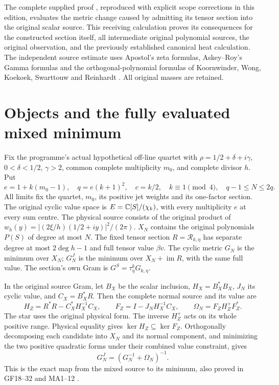 \documentclass[11pt]{article}
\begin{document}
The complete supplied proof \cite{mrjm:Input}, reproduced with explicit
scope corrections in this edition, evaluates the metric change caused by
admitting its tensor section into the original scalar source.
This receiving calculation proves its consequences for the constructed
section itself, all intermediate original polynomial sources, the original
observation, and the previously established canonical heat calculation.
The independent source estimate uses Apostol's zeta formulas,
Askey--Roy's Gamma formulas and the orthogonal-polynomial formulas of
Koornwinder, Wong, Koekoek, Swarttouw and Reinhardt
\cite{mrjm:Apostol,mrjm:Gamma,mrjm:MP}. All original masses are retained.

\section{Objects and the fully evaluated mixed minimum}
Fix the programme's actual hypothetical off-line quartet with
$\rho=1/2+\delta+i\gamma$, $0<\delta<1/2$, $\gamma>2$, common complete
multiplicity $m_0$, and complete divisor $h$. Put
\[
 e=1+k(m_0-1),\quad q=e(k+1)^2,\quad c=k/2,\quad
 k\equiv1\pmod4,\quad q-1\le N\le2q.
 \tag{JM1}
\]
All limits fix the quartet, $m_0$, its positive jet weights and its
one-factor section. The original cyclic value space is
$E=\mathbb C[S]/(\chi_k)$, with every multiplicity $e$ at every sum centre.
The physical source consists of the original product of
$w_h(y)=|(2\xi/h)(1/2+iy)|^2/(2\pi)$.
$X_N$ contains the original polynomials $P(S)$ of degree at most $N$.
The fixed tensor section $R=\mathcal R_{k,\eta}$ has separate degree
at most $2\deg h-1$ and full tensor value $\beta v$.
The cyclic metric $G_N$ is the minimum over $X_N$; $G_N^J$ is the
minimum over $X_N+\operatorname{im}R$, with the same full value.
The section's own Gram is $G^S=\tau_\eta^kG_{k,\eta}$.

In the original source Gram, let $B_X$ be the scalar inclusion,
$H_X=B_X^*B_X$, $J_N$ its cyclic value, and $C_X=B_X^*R$.
Then the complete normal source and its value are
\[
 H_Z=R^*R-C_X^*H_X^{-1}C_X,\qquad
 F_Z=I-J_NH_X^{-1}C_X,\qquad
 \Omega_N=F_ZH_Z^+F_Z^*.
 \tag{JM2}
\]
The star uses the original physical form. The inverse $H_Z^+$ acts on
its whole positive range. Physical equality gives
$\ker H_Z\subseteq\ker F_Z$. Orthogonally decomposing each candidate
into $X_N$ and its normal component, and minimizing the two positive
quadratic forms under their combined value constraint, gives
\[
 G_N^J=(G_N^{-1}+\Omega_N)^{-1}.\tag{JM3}
\]
This is the exact map from the mixed source to its minimum, also proved
in GF18--32 and MA1--12 \cite{mrjm:GF,mrjm:MA}.
\end{document}
